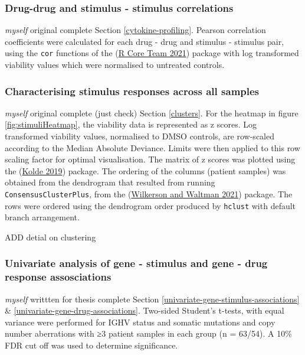 \documentclass[11pt, a4paper, twosided]{book}
\begin{document}
\hypertarget{correlations}{%
\subsubsection{Drug-drug and stimulus - stimulus correlations}\label{correlations}}

\emph{myself} original complete
Section \ref{cytokine-profiling}. Pearson correlation coefficients were calculated for each drug - drug and stimulus - stimulus pair, using the \texttt{cor} functions of the (\protect\hyperlink{ref-R-base}{R Core Team 2021}) package with log transformed viability values which were normalised to untreated controls.

\hypertarget{stimulus-heatmap-method}{%
\subsubsection{Characterising stimulus responses across all samples}\label{stimulus-heatmap-method}}

\emph{myself} original complete (just check)
Section \ref{clusters}. For the heatmap in figure \ref{fig:stimuliHeatmap}, the viability data is represented as z scores. Log transformed viability values, normalised to DMSO controls, are row-scaled according to the Median Absolute Deviance. Limits were then applied to this row scaling factor for optimal visualisation. The matrix of z scores was plotted using the (\protect\hyperlink{ref-R-pheatmap}{Kolde 2019}) package. The ordering of the columns (patient samples) was obtained from the dendrogram that resulted from running \texttt{ConsensusClusterPlus}, from the (\protect\hyperlink{ref-R-ConsensusClusterPlus}{Wilkerson and Waltman 2021}) package. The rows were ordered using the dendrogram order produced by \texttt{hclust} with default branch arrangement.

ADD detial on clustering

\hypertarget{univariate-gene-stimulus-associations-method}{%
\subsubsection{Univariate analysis of gene - stimulus and gene - drug response assosciations}\label{univariate-gene-stimulus-associations-method}}

\emph{myself} writtten for thesis complete
Section \ref{univariate-gene-stimulus-associations} \& \ref{univariate-gene-drug-associations}. Two-sided Student's t-tests, with equal variance were performed for IGHV status and somatic mutations and copy number aberrations with ≥3 patient samples in each group (n = 63/54). A 10\% FDR cut off was used to determine significance.
\end{document}
